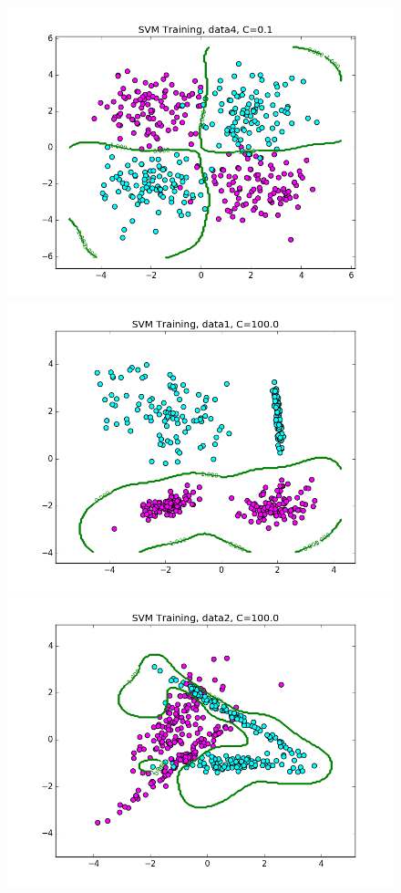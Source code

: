 \documentclass{article}
\begin{document}
\begin{figure}[width=\linewidth]
\begin{multicols}{2}
  \includegraphics[width=1.2\linewidth]{code/P2/rbf_training,C=01,data4.png}
  \includegraphics[width=1.2\linewidth]{code/P2/rbf_training,C=100,data1.png}
  \includegraphics[width=1.2\linewidth]{code/P2/rbf_training,C=100,data2.png}

\end{multicols}
\end{figure}
\end{document}
